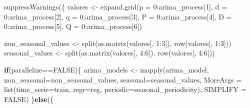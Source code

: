 \documentclass[
]{article}
\newenvironment{Shaded}{\begin{snugshade}}{\end{snugshade}}
\newcommand{\AttributeTok}[1]{\textcolor[rgb]{0.77,0.63,0.00}{#1}}
\newcommand{\ConstantTok}[1]{\textcolor[rgb]{0.00,0.00,0.00}{#1}}
\newcommand{\ControlFlowTok}[1]{\textcolor[rgb]{0.13,0.29,0.53}{\textbf{#1}}}
\newcommand{\DecValTok}[1]{\textcolor[rgb]{0.00,0.00,0.81}{#1}}
\newcommand{\FunctionTok}[1]{\textcolor[rgb]{0.00,0.00,0.00}{#1}}
\newcommand{\NormalTok}[1]{#1}
\newcommand{\OtherTok}[1]{\textcolor[rgb]{0.56,0.35,0.01}{#1}}
\newcommand{\SpecialCharTok}[1]{\textcolor[rgb]{0.00,0.00,0.00}{#1}}
\begin{document}
\begin{Shaded}
\begin{Highlighting}[]
    \FunctionTok{suppressWarnings}\NormalTok{(\{}
\NormalTok{        valores }\OtherTok{\textless{}{-}} \FunctionTok{expand.grid}\NormalTok{(}\AttributeTok{p =} \DecValTok{0}\SpecialCharTok{:}\NormalTok{arima\_process[}\DecValTok{1}\NormalTok{], }
                               \AttributeTok{d =} \DecValTok{0}\SpecialCharTok{:}\NormalTok{arima\_process[}\DecValTok{2}\NormalTok{], }
                               \AttributeTok{q =} \DecValTok{0}\SpecialCharTok{:}\NormalTok{arima\_process[}\DecValTok{3}\NormalTok{],}
                               \AttributeTok{P =} \DecValTok{0}\SpecialCharTok{:}\NormalTok{arima\_process[}\DecValTok{4}\NormalTok{], }
                               \AttributeTok{D =} \DecValTok{0}\SpecialCharTok{:}\NormalTok{arima\_process[}\DecValTok{5}\NormalTok{], }
                               \AttributeTok{Q =} \DecValTok{0}\SpecialCharTok{:}\NormalTok{arima\_process[}\DecValTok{6}\NormalTok{])}

\NormalTok{        non\_seasonal\_values }\OtherTok{\textless{}{-}} \FunctionTok{split}\NormalTok{(}\FunctionTok{as.matrix}\NormalTok{(valores[, }\DecValTok{1}\SpecialCharTok{:}\DecValTok{3}\NormalTok{]),}
                                     \FunctionTok{row}\NormalTok{(valores[, }\DecValTok{1}\SpecialCharTok{:}\DecValTok{3}\NormalTok{]))}
\NormalTok{        seasonal\_values }\OtherTok{\textless{}{-}} \FunctionTok{split}\NormalTok{(}\FunctionTok{as.matrix}\NormalTok{(valores[, }\DecValTok{4}\SpecialCharTok{:}\DecValTok{6}\NormalTok{]),}
                                 \FunctionTok{row}\NormalTok{(valores[, }\DecValTok{4}\SpecialCharTok{:}\DecValTok{6}\NormalTok{]))}

        \ControlFlowTok{if}\NormalTok{(parallelize}\SpecialCharTok{==}\ConstantTok{FALSE}\NormalTok{)\{}
\NormalTok{            arima\_models }\OtherTok{\textless{}{-}} \FunctionTok{mapply}\NormalTok{(arima\_model,}
                                   \AttributeTok{non\_seasonal=}\NormalTok{non\_seasonal\_values,}
                                   \AttributeTok{seasonal=}\NormalTok{seasonal\_values,}
                                   \AttributeTok{MoreArgs =} \FunctionTok{list}\NormalTok{(}\AttributeTok{time\_serie=}\NormalTok{train, }
                                                   \AttributeTok{regr=}\NormalTok{reg, }
                                      \AttributeTok{periodic=}\NormalTok{seasonal\_periodicity),}
                                   \AttributeTok{SIMPLIFY =} \ConstantTok{FALSE}\NormalTok{)}
\NormalTok{        \}}\ControlFlowTok{else}\NormalTok{(\{}


\end{Highlighting}
\end{Shaded}
\end{document}
